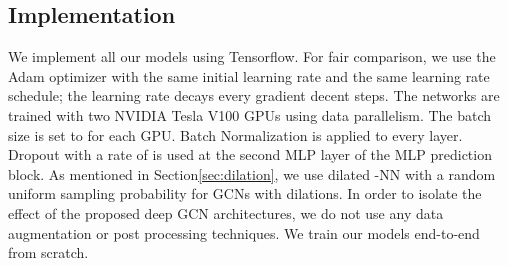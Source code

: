 \documentclass[10pt,twocolumn,letterpaper]{article}
\newcommand{\secLabel}{Section\xspace}
\begin{document}
\subsection{Implementation}
We implement all our models using Tensorflow. For fair comparison, we use the Adam optimizer with the same initial learning rate  and the same learning rate schedule; the learning rate decays  every  gradient decent steps. The networks are trained with two NVIDIA Tesla V100 GPUs using data parallelism. The batch size is set to  for each GPU. Batch Normalization is applied to every layer. Dropout with a rate of  is used at the second MLP layer of the MLP prediction block. As mentioned in \secLabel \ref{sec:dilation}, we use dilated -NN with a random uniform sampling probability  for GCNs with dilations. In order to isolate the effect of the proposed deep GCN architectures, we do not use any data augmentation or post processing techniques. We train our models end-to-end from scratch.
\end{document}
